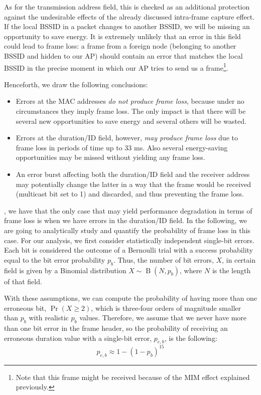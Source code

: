 \documentclass[twoside,nohyper]{tufte-book}
\providecommand{\tightlist}{%
  \setlength{\itemsep}{0pt}\setlength{\parskip}{0pt}}
\theoremstyle{definition}
\theoremstyle{definition}
\theoremstyle{definition}
\theoremstyle{remark}
\begin{document}
As for the transmission address field, this is checked as an additional
protection against the undesirable effects of the already discussed
intra-frame capture effect. If the local BSSID in a packet changes to
another BSSID, we will be missing an opportunity to save energy. It is
extremely unlikely that an error in this field could lead to frame loss:
a frame from a foreign node (belonging to another BSSID and hidden to
our AP) should contain an error that matches the local BSSID in the
precise moment in which our AP tries to send us a frame\footnote{Note
  that this frame might be received because of the MIM effect explained
  previously.}.

Henceforth, we draw the following conclusions:

\begin{itemize}
\tightlist
\item
  Errors at the MAC addresses \emph{do not produce frame loss}, because
  under no circumstances they imply frame loss. The only impact is that
  there will be several new opportunities to save energy and several
  others will be wasted.
\item
  Errors at the duration/ID field, however, \emph{may produce frame
  loss} due to frame loss in periods of time up to 33 ms. Also several
  energy-saving opportunities may be missed without yielding any frame
  loss.
\item
  An error burst affecting both the duration/ID field and the receiver
  address may potentially change the latter in a way that the frame
  would be received (multicast bit set to 1) and discarded, and thus
  preventing the frame loss.
\end{itemize}

, we have that the only case that may yield
performance degradation in terms of frame loss is when we have errors in
the duration/ID field. In the following, we are going to analytically
study and quantify the probability of frame loss in this case. For our
analysis, we first consider statistically independent single-bit errors.
Each bit is considered the outcome of a Bernoulli trial with a success
probability equal to the bit error probability \(p_{b}\). Thus, the
number of bit errors, \(X\), in certain field is given by a Binomial
distribution \(X\sim \operatorname{B}(N, p_b)\), where \(N\) is the
length of that field.

With these assumptions, we can compute the probability of having more
than one erroneous bit, \(\Pr(X \geq 2)\), which is three-four orders of
magnitude smaller than \(p_b\) with realistic \(p_b\) values. Therefore,
we assume that we never have more than one bit error in the frame
header, so the probability of receiving an erroneous duration value with
a single-bit error, \(p_{e,b}\), is the following:
%
\begin{equation}
 p_{e,b} \approx 1 - (1 - p_b)^{15} \label{eq:peb}
\end{equation}
%
\end{document}
